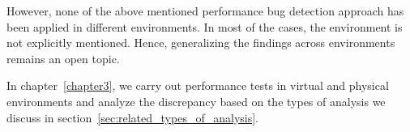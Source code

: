 However, none of the above mentioned performance bug detection approach has been applied in different environments. In most of the cases, the environment is not explicitly mentioned. Hence, generalizing the findings across environments remains an open topic.

In chapter~\ref{chapter3}, we carry out performance tests in virtual and physical environments and analyze the discrepancy based on the types of analysis we discuss in section~\ref{sec:related_types_of_analysis}. 
